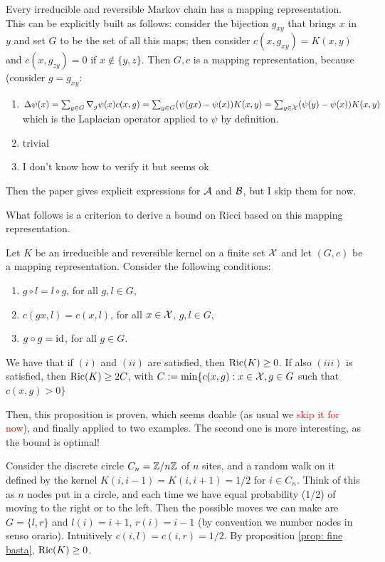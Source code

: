 Every irreducible and reversible Markov chain has a mapping representation. This can be explicitly built as follows: consider the bijection $g_{xy}$ that brings $x$ in $y$ and set $G$ to be the set of all this maps; then consider $c(x,g_{xy})=K(x,y)$ and $c(x,g_{zy})=0$ if $x\notin \{y,z\}$. Then $G,c$ is a mapping representation, because (consider $g=g_{xy}$:
\begin{enumerate}
    \item $\Delta \psi (x) = \sum_{g\in G} \nabla_g\psi(x) c(x,g) = \sum_{g\in G} (\psi(gx)-\psi(x))K(x,y) = \sum_{y\in\mathcal{X}} (\psi(y)-\psi(x))K(x,y)$ 
    which is the Laplacian operator applied to $\psi$ by definition.
    \item trivial
    \item I don't know how to verify it but seems ok
\end{enumerate}

Then the paper gives explicit expressions for $\mathcal{A}$ and $\mathcal{B}$, but I skip them for now. 

What follows is a criterion to derive a bound on Ricci based on this mapping representation. 

\begin{proposition}\label{prop: fine basta}
    Let $K$ be an irreducible and reversible kernel on a finite set $\mathcal{X}$ and let $(G,c)$ be a mapping representation. Consider the following conditions:
    \begin{enumerate}[label=($\roman*$)]
        \item $g \circ l = l \circ g$, for all $g,l\in G$,
        \item $c(gx,l)=c(x,l)$, for all $x\in\mathcal{X}$, $g,l \in G$,
        \item $g\circ g= \operatorname*{id}$, for all $g \in G$.
    \end{enumerate}
    We have that if $(i)$ and $(ii)$ are satisfied, then $\mathop{\mathrm{Ric}}\nolimits(K)\ge0$. If also $(iii)$ is satisfied, then $\mathop{\mathrm{Ric}}\nolimits(K)\ge2C$, with $C:= \min \{c(x,g):x \in\mathcal{X}, g\in G$ such that $c(x,g)>0\}$

\end{proposition}

Then, this proposition is proven, which seems doable (as usual we \textcolor{red}{skip it for now}), and finally applied to two examples. The second one is more interesting, as the bound is optimal!

\begin{example}
    Consider the discrete circle $C_n = \mathbb{Z}/ n\mathbb{Z}$ of $n$ sites, and a random walk on it defined by the kernel $K(i,i-1)=K(i,i+1)=1/2$ for $i \in C_n$. Think of this as $n$ nodes put in a circle, and each time we have equal probability (1/2) of moving to the right or to the left. Then the possible moves we can make are $G=\{l,r\}$ and $l(i)=i+1$, $r(i)=i-1$ (by convention we number nodes in senso orario). Intuitively $c(i,l)=c(i,r)=1/2$. By proposition \ref{prop: fine basta}, $\mathop{\mathrm{Ric}}\nolimits(K)\ge0$. 
\end{example}

